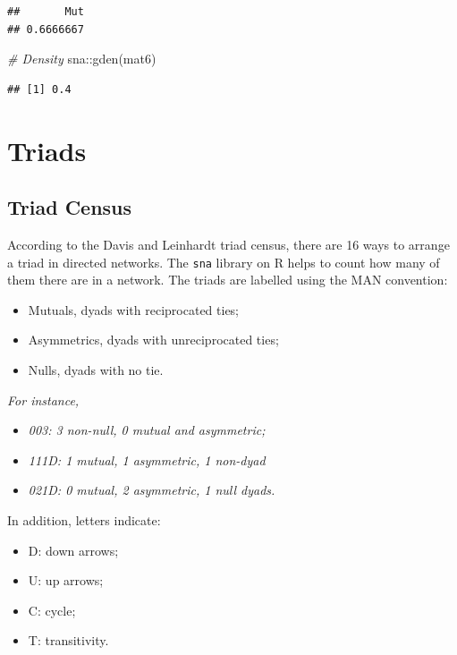 \documentclass[
  notitlepage,
  onecolumn,
  openany]{book}
\newenvironment{Shaded}{\begin{snugshade}}{\end{snugshade}}
\newcommand{\CommentTok}[1]{\textcolor[rgb]{0.56,0.35,0.01}{\textit{#1}}}
\newcommand{\FunctionTok}[1]{\textcolor[rgb]{0.00,0.00,0.00}{#1}}
\newcommand{\NormalTok}[1]{#1}
\newcommand{\SpecialCharTok}[1]{\textcolor[rgb]{0.00,0.00,0.00}{#1}}
\providecommand{\tightlist}{%
  \setlength{\itemsep}{0pt}\setlength{\parskip}{0pt}}
\begin{document}
\begin{verbatim}
##       Mut 
## 0.6666667
\end{verbatim}

\begin{Shaded}
\begin{Highlighting}[]
\CommentTok{\# Density}
\NormalTok{sna}\SpecialCharTok{::}\FunctionTok{gden}\NormalTok{(mat6)}
\end{Highlighting}
\end{Shaded}

\begin{verbatim}
## [1] 0.4
\end{verbatim}

\hypertarget{triads}{%
\section{Triads}\label{triads}}

\hypertarget{triad-census}{%
\subsection{Triad Census}\label{triad-census}}

According to the Davis and Leinhardt triad census, there are 16 ways to arrange a triad in directed networks. The \texttt{sna} library on R helps to count how many of them there are in a network. The triads are labelled using the MAN convention:

\begin{itemize}
\tightlist
\item
  Mutuals, dyads with reciprocated ties;
\item
  Asymmetrics, dyads with unreciprocated ties;
\item
  Nulls, dyads with no tie.
\end{itemize}

\emph{For instance,}

\begin{itemize}
\tightlist
\item
  \emph{003: 3 non-null, 0 mutual and asymmetric;}
\item
  \emph{111D: 1 mutual, 1 asymmetric, 1 non-dyad}
\item
  \emph{021D: 0 mutual, 2 asymmetric, 1 null dyads.}
\end{itemize}

In addition, letters indicate:

\begin{itemize}
\item
  D: down arrows;
\item
  U: up arrows;
\item
  C: cycle;
\item
  T: transitivity.
\end{itemize}
\end{document}
